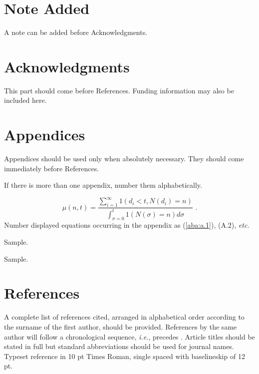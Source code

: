 \documentclass{ws-jai}
\begin{document}
\section*{Note Added}
A note can be added before Acknowledgments.

\section*{Acknowledgments}
This part should come before References. Funding information may also be included here.

\section*{Appendices}
Appendices should be used only
when absolutely necessary. They should come immediately before
References.

\appendix{} %
If there is more than one appendix, number them alphabetically.

\noindent
\begin{equation}
\mu(n, t) = \frac{\displaystyle\sum^\infty_{i=1} 1(d_i < t, N(d_i) = n)}
{\displaystyle\int^t_{\sigma=0} 1(N(\sigma) = n)d\sigma}\,\,
.\label{aba:a.1}
\end{equation}
Number displayed equations occurring in the appendix as (\ref{aba:a.1}),
(A.2), {\it etc.}

\begin{theorem}
Sample.
\end{theorem}

\begin{lemma}
Sample.
\end{lemma}

\section*{References}
\noindent A complete list of references cited, arranged in
alphabetical order according to the surname of the first author,
should be provided. References by the same author will follow a
chronological sequence, {\it i.e.}, \cite{Lie00} precedes \cite{Lie01}.
Article titles should be stated in full but standard abbreviations
should be used for journal names. Typeset reference in 10 pt Times
Roman, single spaced with baselineskip of 12 pt.
\end{document}
